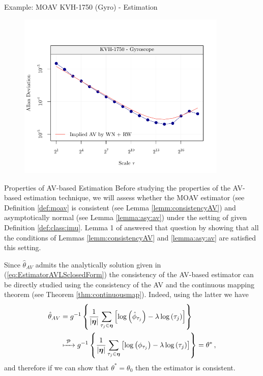 \documentclass[envcountsect,usenames,dvipsnames]{beamer}
\theoremstyle{mystyle}
\begin{document}
\begin{frame}{Example: MOAV KVH-1750 (Gyro) - Estimation}
\vspace{-0.75cm}
    \begin{figure}
	    \centering
	  \includegraphics[width = 10cm]{Images/av_example_kvh_part4.pdf}
	\end{figure}
\end{frame}


\begin{frame}{Properties of AV-based Estimation}
\small
    Before studying the properties of the AV-based estimation technique, we will assess whether the MOAV estimator (see Definition \ref{def:moav} is consistent (see Lemma \ref{lemm:consistencyAV}) and asymptotically normal (see Lemma \ref{lemma:asy:av}) under the setting of given Definition \ref{def:class:imu}. Lemma 1 of \cite{guerrier2016theoretical} answered that question by showing that all the conditions of Lemmas \ref{lemm:consistencyAV} and \ref{lemma:asy:av} are satisfied this setting. 
    
    \vspace{0.25cm}
    Since $\hat{\theta}_{AV}$ admits the analytically solution given in (\ref{eq:EstimatorAVLSclosedForm}) the consistency of the AV-based estimator can be directly studied using the consistency of the AV and the continuous mapping theorem (see Theorem \ref{thm:continuousmap}). Indeed, using the latter we have
    \begin{equation*}
    \begin{aligned}
        \hat{\theta}_{AV} &= g^{-1} \left\{\frac{1}{| \bm{\eta}|} \sum_{\tau_j \in \bm{\eta}} \left[ \log \left( \hat{\phi}_{\tau_j}  \right) - \lambda \log \left( \tau_j \right)\right]\right\}   \\
        &\xmapsto[\;\;\;\;\; ]{\mathcal{P}}  g^{-1} \left\{\frac{1}{| \bm{\eta}|} \sum_{\tau_j \in \bm{\eta}} \left[ \log \left( {\phi}_{\tau_j}  \right) - \lambda \log \left( \tau_j \right)\right]\right\} = \theta^* \, ,
    \end{aligned}
    \end{equation*}
    and therefore if we can show that $\theta^* = \theta_0$ then the estimator is consistent.

\end{frame}
\end{document}
